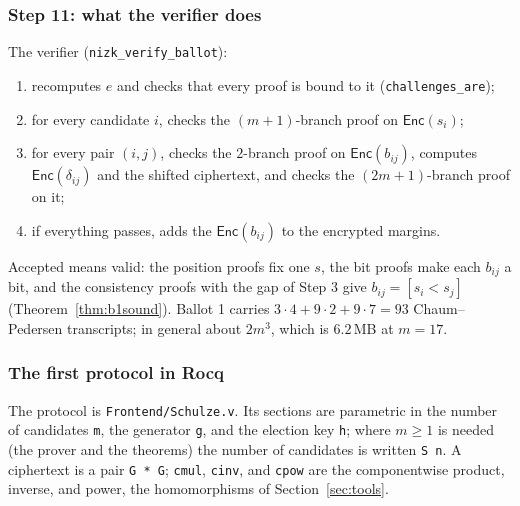 \documentclass[11pt,a4paper]{article}
\newcommand{\Enc}{\mathsf{Enc}}
\newcommand{\rocq}[1]{\texttt{#1}}
\theoremstyle{remark}
\begin{document}
\subsubsection*{Step 11: what the verifier does}
The verifier (\rocq{nizk\_verify\_ballot}):
\begin{enumerate}[nosep]
  \item recomputes $e$ and checks that every proof is bound to it
  (\rocq{challenges\_are});
  \item for every candidate $i$, checks the $(m+1)$-branch proof on
  $\Enc(s_i)$;
  \item for every pair $(i, j)$, checks the $2$-branch proof on
  $\Enc(b_{ij})$, computes $\Enc(\delta_{ij})$ and the shifted ciphertext,
  and checks the $(2m+1)$-branch proof on it;
  \item if everything passes, adds the $\Enc(b_{ij})$ to the encrypted
  margins.
\end{enumerate}
Accepted means valid: the position proofs fix one $s$, the bit proofs make
each $b_{ij}$ a bit, and the consistency proofs with the gap of Step 3
give $b_{ij} = [s_i < s_j]$ (Theorem~\ref{thm:b1sound}). Ballot 1 carries
$3 \cdot 4 + 9 \cdot 2 + 9 \cdot 7 = 93$ Chaum--Pedersen transcripts; in
general about $2m^3$, which is $6.2$\,MB at $m = 17$.

\subsubsection*{The first protocol in Rocq}
The protocol is \rocq{Frontend/Schulze.v}. Its sections are parametric
in the number of candidates \rocq{m}, the generator \rocq{g}, and the
election key \rocq{h}; where $m \ge 1$ is needed (the prover and the
theorems) the number of candidates is written \rocq{S n}. A ciphertext is a pair \rocq{G * G};
\rocq{cmul}, \rocq{cinv}, and \rocq{cpow} are the componentwise product,
inverse, and power, the homomorphisms of Section~\ref{sec:tools}.
\end{document}
